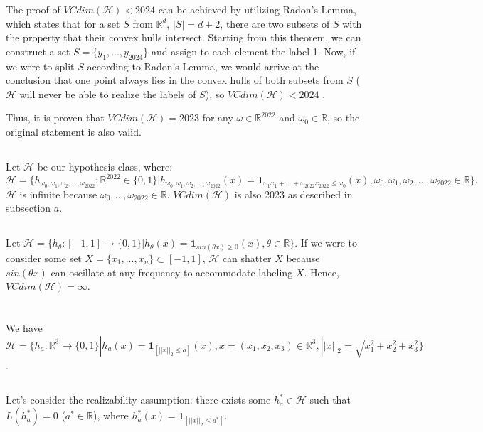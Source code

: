 \documentclass{article}
\newcounter{theorem}
\begin{document}
The proof of $VCdim(\mathcal{H}) < 2024$ can be achieved by utilizing Radon's Lemma, which states that for a set $S$ from $\mathbb{R}^d$, $|S|=d+2$, there are two subsets of $S$ with the property that their convex hulls intersect. Starting from this theorem, we can construct a set $S=\{y_1,...,y_{2024}\}$ and assign to each element the label 1. Now, if we were to split $S$ according to Radon's Lemma, we would arrive at the conclusion that one point always lies in the convex hulls of both subsets from $S$ ($\mathcal{H}$ will never be able to realize the labels of $S$), so $VCdim(\mathcal{H}) < 2024$ \cite{vcdim2023}.

Thus, it is proven that $VCdim(\mathcal{H})=2023$ for any $\omega\in\mathbb{R}^{2022}$ and $\omega_0 \in \mathbb{R}$, so the original statement is also valid.
\subsection{}
Let $\mathcal{H}$ be our hypothesis class, where:
$
\mathcal{H}=\{h_{\omega_0, \omega_1,\omega_2,...,\omega_{2022}}:\mathbb{R}^{2022}\in\{0,1\}|h_{\omega_0, \omega_1,\omega_2,...,\omega_{2022}}(x) = \mathbf{1}_{\omega_1x_1 + ... + \omega_{2022}x_{2022} \leq \omega_0}(x), \omega_0, \omega_1,\omega_2,...,\omega_{2022}\in \mathbb{R}\}.
$
$\mathcal{H}$ is infinite because $\omega_0,...,\omega_{2022}\in\mathbb{R}$. $VCdim(\mathcal{H})$ is also 2023 as described in subsection $a$.
\subsection{}
Let $\mathcal{H}=\{ h_\theta:[-1,1]\rightarrow\{0,1\}|h_\theta(x)=\mathbf{1}_{sin(\theta x) \geq 0}(x), \theta \in \mathbb{R}\}$. If we were to consider some set $X=\{x_1,...,x_n\}\subset[-1,1]$, $\mathcal{H}$ can shatter $X$ because $sin(\theta x)$ can oscillate at any frequency to accommodate labeling $X$. Hence, $VCdim(\mathcal{H})=\infty$. 

\section{}
We have $\mathcal{H}=\{ h_a:\mathbb{R}^3\rightarrow \{0,1\}|h_a(x)=\mathbf{1}_{[||x||_2\leq a]}(x), x=(x_1,x_2,x_3)\in\mathbb{R}^3, ||x||_2 = \sqrt{x_1^2+x_2^2+x_3^2} \}$.
\subsection{}
Let's consider the realizability assumption: there exists some $h_a^*\in\mathcal{H}$ such that $L(h_a^*)=0$ ($a^*\in\mathbb{R}$), where $h_a^*(x)=\mathbf{1}_{[||x||_2\leq a^*]}$.
\end{document}
